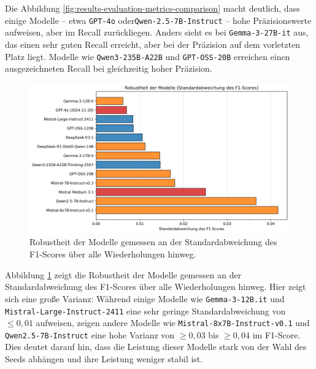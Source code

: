 Die Abbildung \ref{fig:results-evaluation-metrics-comparison} macht deutlich, dass einige Modelle – etwa \texttt{GPT-4o} oder\linebreak\texttt{Qwen-2.5-7B-Instruct} – hohe Präzisionswerte aufweisen, aber im Recall zurückliegen. Anders sieht es bei \texttt{Gemma-3-27B-it} aus, das einen sehr guten Recall erreicht, aber bei der Präzision auf dem vorletzten Platz liegt. Modelle wie \texttt{Qwen3-235B-A22B} und \texttt{GPT-OSS-20B} erreichen einen ausgezeichneten Recall bei gleichzeitig hoher Präzision.

\begin{figure}[htbp]
    \centering
    \includegraphics[width=\textwidth,trim=20 40 20 10,clip]{images/results/evaluation_robustness_f1_std}
    \caption{Robustheit der Modelle gemessen an der Standardabweichung des F1-Scores über alle Wiederholungen hinweg.}
    \label{fig:results-evaluation-robustness-f1-std}
\end{figure}

Abbildung \ref{fig:results-evaluation-robustness-f1-std} zeigt die Robustheit der Modelle gemessen an der Standardabweichung des F1-Scores über alle Wiederholungen hinweg. Hier zeigt sich eine große Varianz: Während einige Modelle wie \texttt{Gemma-3-12B.it} und \texttt{Mistral-Large-Instruct-2411} eine sehr geringe Standardabweichung von $\le 0{,}01$ aufweisen, zeigen andere Modelle wie \texttt{Mistral-8x7B-Instruct-v0.1} und \texttt{Qwen2.5-7B-Instruct} eine hohe Varianz von $\ge 0{,}03$ bis $\ge 0{,}04$ im F1-Score. Dies deutet darauf hin, dass die Leistung dieser Modelle stark von der Wahl des Seeds abhängen und ihre Leistung weniger stabil ist.